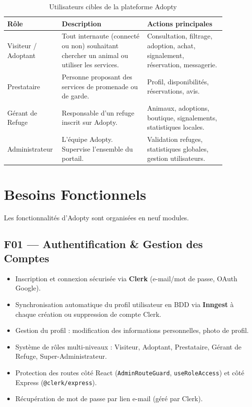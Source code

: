 \documentclass[12pt,a4paper]{report}
\begin{document}
\begin{table}[H]
\centering
\begin{tabular}{@{}L{0.18\linewidth}L{0.37\linewidth}L{0.34\linewidth}@{}}
\toprule
\textbf{Rôle} & \textbf{Description} & \textbf{Actions principales} \\
\midrule
Visiteur / Adoptant
  & Tout internaute (connecté ou non) souhaitant chercher un animal ou utiliser les services.
  & Consultation, filtrage, adoption, achat, signalement, réservation, messagerie. \\[6pt]
Prestataire
  & Personne proposant des services de promenade ou de garde.
  & Profil, disponibilités, réservations, avis. \\[6pt]
Gérant de Refuge
  & Responsable d'un refuge inscrit sur Adopty.
  & Animaux, adoptions, boutique, signalements, statistiques locales. \\[6pt]
Administrateur
  & L'équipe Adopty. Supervise l'ensemble du portail.
  & Validation refuges, statistiques globales, gestion utilisateurs. \\
\bottomrule
\end{tabular}
\caption{Utilisateurs cibles de la plateforme Adopty}
\label{tab:acteurs}
\end{table}

\section{Besoins Fonctionnels}

Les fonctionnalités d'Adopty sont organisées en neuf modules.

\subsection{F01 --- Authentification \& Gestion des Comptes}
\begin{itemize}[leftmargin=2em,itemsep=2pt]
  \item Inscription et connexion sécurisée via \textbf{Clerk} (e-mail/mot de passe, OAuth Google).
  \item Synchronisation automatique du profil utilisateur en BDD via \textbf{Inngest} à chaque création ou suppression de compte Clerk.
  \item Gestion du profil : modification des informations personnelles, photo de profil.
  \item Système de rôles multi-niveaux : Visiteur, Adoptant, Prestataire, Gérant de Refuge, Super-Administrateur.
  \item Protection des routes côté React (\texttt{AdminRouteGuard}, \texttt{useRoleAccess}) et côté Express (\texttt{@clerk/express}).
  \item Récupération de mot de passe par lien e-mail (géré par Clerk).
\end{itemize}
\end{document}
